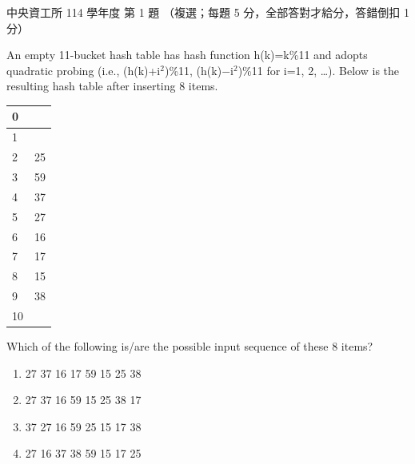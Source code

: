 \begin{pastexam}[label={px:ncu-114-dsa-01}]{中央資工所 114 學年度 第 1 題}
（複選；每題 5 分，全部答對才給分，答錯倒扣 1 分）

An empty 11-bucket hash table has hash function h(k)=k\%11 and adopts quadratic probing (i.e.,
(h(k)+i$^2$)\%11, (h(k)$-$i$^2$)\%11 for i=1, 2, \ldots). Below is the resulting hash table after
inserting 8 items.
\begin{center}
\begin{tabular}{|l|l|}
\hline
0 & \\ \hline
1 & \\ \hline
2 & 25 \\ \hline
3 & 59 \\ \hline
4 & 37 \\ \hline
5 & 27 \\ \hline
6 & 16 \\ \hline
7 & 17 \\ \hline
8 & 15 \\ \hline
9 & 38 \\ \hline
10 & \\ \hline
\end{tabular}
\end{center}
Which of the following is/are the possible input sequence of these 8 items?
\begin{enumerate}[label=(\alph*)]
\item 27 37 16 17 59 15 25 38
\item 27 37 16 59 15 25 38 17
\item 37 27 16 59 25 15 17 38
\item 27 16 37 38 59 15 17 25
\end{enumerate}
\end{pastexam}

